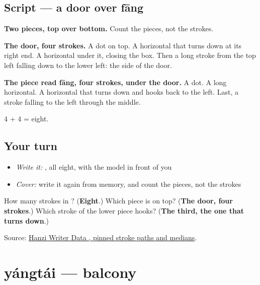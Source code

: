 \subsection*{Script — a door over fāng}

\begin{quote}
\end{quote}

\textbf{Two pieces, top over bottom.} Count the pieces, not the strokes.

\textbf{The door, four strokes.} A dot on top. A horizontal that turns down at its right end. A horizontal under it, closing the box. Then a long stroke from the top left falling down to the lower left: the side of the door.

\textbf{The piece read fāng, four strokes, under the door.} A dot. A long horizontal. A horizontal that turns down and hooks back to the left. Last, a stroke falling to the left through the middle.

4 + 4 = eight.

\subsection*{Your turn}
\begin{itemize}
\raggedright
  \item \emph{Write it:} , all eight, with the model in front of you
  \item \emph{Cover:} write it again from memory, and count the pieces, not the strokes
\end{itemize}

\begin{tcolorbox}[breakable,colback=teal!4,colframe=teal!35!black,title={Before you move on}]
How many strokes in ? (\textbf{Eight}.) Which piece is on top? (\textbf{The door, four strokes}.) Which stroke of the lower piece hooks? (\textbf{The third, the one that turns down}.)

Source: \href{https://raw.githubusercontent.com/chanind/hanzi-writer-data/68d10a4b21150cae5e1ebbd223eed289cf32d90c/data/\%E6\%88\%BF.json}{Hanzi Writer Data , pinned stroke paths and medians}.
\end{tcolorbox}
\section[yángtái]{yángtái — balcony}

